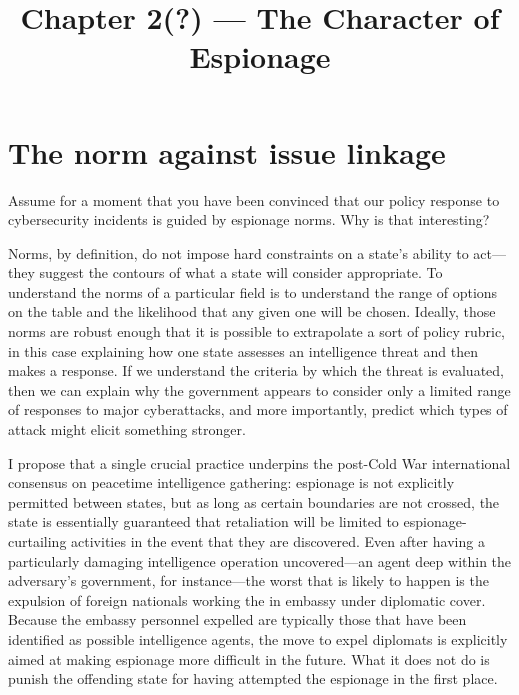 \documentclass[12pt]{article}
\title{Chapter 2(?) --- The Character of Espionage}
\date{}
\begin{document}
\maketitle
\section{The norm against issue linkage}
Assume for a moment that you have been convinced that our policy response to cybersecurity incidents is guided by espionage norms. Why is that interesting?

Norms, by definition, do not impose hard constraints on a state's ability to act---they suggest the contours of what a state will consider appropriate. To understand the norms of a particular field is to understand the range of options on the table and the likelihood that any given one will be chosen. Ideally, those norms are robust enough that it is possible to extrapolate a sort of policy rubric, in this case explaining how one state assesses an intelligence threat and then makes a response. If we understand the criteria by which the threat is evaluated, then we can explain why the government appears to consider only a limited range of responses to major cyberattacks, and more importantly, predict which types of attack might elicit something stronger.

I propose that a single crucial practice underpins the post-Cold War international consensus on peacetime intelligence gathering: espionage is not explicitly permitted between states, but as long as certain boundaries are not crossed, the state is essentially guaranteed that retaliation will be limited to espionage-curtailing activities in the event that they are discovered. Even after having a particularly damaging intelligence operation uncovered---an agent deep within the adversary's government, for instance---the worst that is likely to happen is the expulsion of foreign nationals working the in embassy under diplomatic cover. Because the embassy personnel expelled are typically those that have been identified as possible intelligence agents, the move to expel diplomats is explicitly aimed at making espionage more difficult in the future. What it does not do is punish the offending state for having attempted the espionage in the first place.
\end{document}
